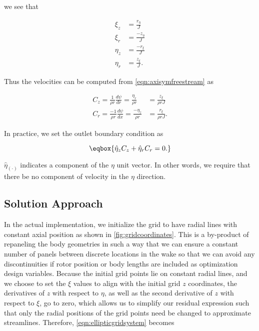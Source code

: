 \noindent we see that

\begin{align}
    \xi_z &= \frac{r_\eta}{J} \\
    \xi_r &= \frac{-z_\eta}{J} \\
    \eta_z &= \frac{-r_\xi}{J} \\
    \eta_r &= \frac{z_\xi}{J}.
\end{align}

\noindent Thus the velocities can be computed from \cref{eqn:axisymfreestream} as

\begin{align}
    C_z = \frac{1}{\rho r} \frac{d\psi}{dr} = \frac{\eta_r}{\rho r} &= \frac{z_\xi}{\rho r J} \\
    C_r = \frac{-1}{\rho r} \frac{d\psi}{dx} = \frac{-\eta_z}{\rho r} &= \frac{r_\xi}{\rho r J}.
\end{align}

In practice, we set the outlet boundary condition as

\begin{equation}
\eqbox{
    \hat{\eta}_z C_z + \hat{\eta}_r C_r  = 0.
}
\end{equation}

\where \(\hat{\eta}_{(\cdot)}\) indicates a component of the \(\eta\) unit vector.
%
In other words, we require that there be no component of velocity in the \(\eta\) direction.


\subsection{Solution Approach}

In the actual implementation, we initialize the grid to have radial lines with constant axial position as shown in \cref{fig:gridcoordinates}.
%
This is a by-product of repaneling the body geometries in such a way that we can ensure a constant number of panels between discrete locations in the wake so that we can avoid any discontinuities if rotor position or body lengths are included as optimization design variables.
%
Because the initial grid points lie on constant radial lines, and we choose to set the \(\xi\) values to align with the initial grid \(z\) coordinates, the derivatives of \(z\) with respect to \(\eta\), as well as the second derivative of \(z\) with respect to \(\xi\), go to zero, which allows us to simplify our residual expression such that only the radial positions of the grid points need be changed to approximate streamlines.
%
Therefore, \cref{eqn:ellipticgridsystem} becomes

